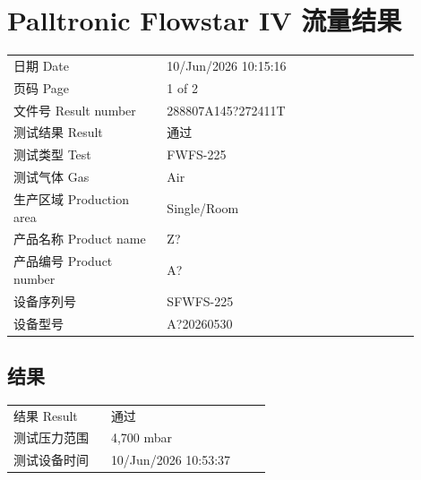 \documentclass[UTF8,10pt,a4paper,fontset=fandol]{ctexart}
\newcommand{\fieldvalue}[1]{#1}
\begin{document}
\newpage

\section*{Palltronic Flowstar IV 流量结果}

\begin{tabular}{@{}p{0.34\linewidth}p{0.56\linewidth}@{}}
日期 Date &
\fieldvalue{10/Jun/2026 10:15:16}
\\
页码 Page &
\fieldvalue{1 of 2}
\\
文件号 Result number &
\fieldvalue{288807A145?272411T}
\\
测试结果 Result &
\fieldvalue{通过}
\\
测试类型 Test &
\fieldvalue{FWFS-225}
\\
测试气体 Gas &
\fieldvalue{Air}
\\
生产区域 Production area &
\fieldvalue{Single/Room}
\\
产品名称 Product name &
\fieldvalue{Z?}
\\
产品编号 Product number &
\fieldvalue{A?}
\\
设备序列号 &
\fieldvalue{SFWFS-225}
\\
设备型号 &
\fieldvalue{A?20260530}
\end{tabular}

\subsection*{结果}

\begin{tabular}{@{}p{0.34\linewidth}p{0.56\linewidth}@{}}
结果 Result &
\fieldvalue{通过}
\\
测试压力范围 &
\fieldvalue{4{,}700 mbar}
\\
测试设备时间 &
\fieldvalue{10/Jun/2026 10:53:37}
\end{tabular}
\end{document}
